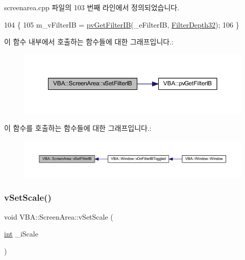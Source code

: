 screenarea.\+cpp 파일의 103 번째 라인에서 정의되었습니다.


\begin{DoxyCode}
104 \{
105   m\_vFilterIB = \mbox{\hyperlink{namespace_v_b_a_ad5980a2981a7b766dce52ebc49a987bb}{pvGetFilterIB}}(\_eFilterIB, \mbox{\hyperlink{class_v_b_a_a6ec41ea038b4ea42eb8d9ea59d3eb4c5a5f5e047b6fb2c818c71882c4b3f3fc0c}{FilterDepth32}});
106 \}
\end{DoxyCode}
이 함수 내부에서 호출하는 함수들에 대한 그래프입니다.\+:
\nopagebreak
\begin{figure}[H]
\begin{center}
\leavevmode
\includegraphics[width=350pt]{class_v_b_a_1_1_screen_area_a7a23a673843050e232e83588cfab81ce_cgraph}
\end{center}
\end{figure}
이 함수를 호출하는 함수들에 대한 그래프입니다.\+:
\nopagebreak
\begin{figure}[H]
\begin{center}
\leavevmode
\includegraphics[width=350pt]{class_v_b_a_1_1_screen_area_a7a23a673843050e232e83588cfab81ce_icgraph}
\end{center}
\end{figure}
\mbox{\label{class_v_b_a_1_1_screen_area_a39182c21dfcc5c1f58171986f9c6305f}} 
\subsubsection{\texorpdfstring{v\+Set\+Scale()}{vSetScale()}}
{\footnotesize\ttfamily void V\+B\+A\+::\+Screen\+Area\+::v\+Set\+Scale (\begin{DoxyParamCaption}\item[{\mbox{\hyperlink{_util_8cpp_a0ef32aa8672df19503a49fab2d0c8071}{int}}}]{\+\_\+i\+Scale }\end{DoxyParamCaption})}



